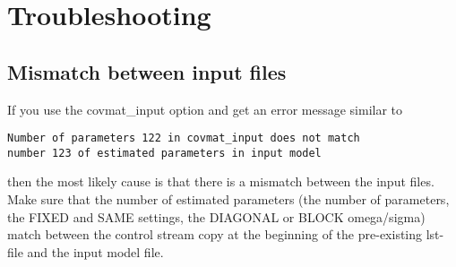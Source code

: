 \section{Troubleshooting}
\subsection*{Mismatch between input files}
If you use the covmat\_input option and get an error message similar to
\begin{verbatim}
Number of parameters 122 in covmat_input does not match 
number 123 of estimated parameters in input model
\end{verbatim}
then the most likely cause is that there is a mismatch between the input files. Make sure that the number of
estimated parameters (the number of parameters, the FIXED and SAME settings, the DIAGONAL or BLOCK omega/sigma)
match between the control stream copy at the beginning of the pre-existing lst-file and the input model file.


